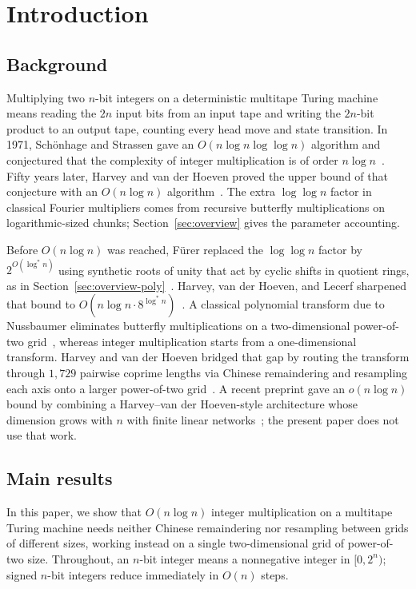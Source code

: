 \section{Introduction}\label{sec:intro}

\subsection{Background}\label{sec:intro-background}

Multiplying two $n$-bit integers on a deterministic multitape Turing machine means reading the $2n$ input bits from an input tape and writing the $2n$-bit product to an output tape, counting every head move and state transition. In 1971, Sch\"onhage and Strassen gave an $O(n \log n \log \log n)$ algorithm and conjectured that the complexity of integer multiplication is of order $n \log n$~\cite{SS71}. Fifty years later, Harvey and van der Hoeven proved the upper bound of that conjecture with an $O(n \log n)$ algorithm~\cite{HvdH21}. The extra $\log \log n$ factor in classical Fourier multipliers comes from recursive butterfly multiplications on logarithmic-sized chunks; Section~\ref{sec:overview} gives the parameter accounting.

Before $O(n \log n)$ was reached, F\"urer replaced the $\log \log n$ factor by $2^{O(\log^* n)}$ using synthetic roots of unity that act by cyclic shifts in quotient rings, as in Section~\ref{sec:overview-poly}~\cite{Furer07,Furer09}. Harvey, van der Hoeven, and Lecerf sharpened that bound to $O(n \log n \cdot 8^{\log^* n})$~\cite{HvdHL16}. A classical polynomial transform due to Nussbaumer eliminates butterfly multiplications on a two-dimensional power-of-two grid~\cite{Nussbaumer80}, whereas integer multiplication starts from a one-dimensional transform. Harvey and van der Hoeven bridged that gap by routing the transform through $1{,}729$ pairwise coprime lengths via Chinese remaindering and resampling each axis onto a larger power-of-two grid~\cite{HvdH21}. A recent preprint gave an $o(n \log n)$ bound by combining a Harvey--van der Hoeven-style architecture whose dimension grows with $n$ with finite linear networks~\cite{OAI26}; the present paper does not use that work.

\subsection{Main results}\label{sec:intro-results}

In this paper, we show that $O(n \log n)$ integer multiplication on a multitape Turing machine needs neither Chinese remaindering nor resampling between grids of different sizes, working instead on a single two-dimensional grid of power-of-two size. Throughout, an $n$-bit integer means a nonnegative integer in $[0, 2^n)$; signed $n$-bit integers reduce immediately in $O(n)$ steps.

